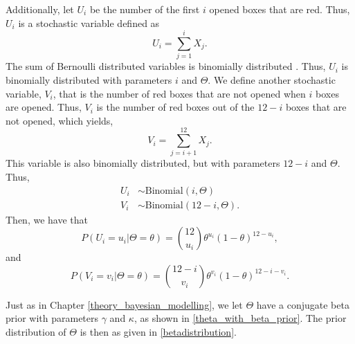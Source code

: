 Additionally, let $U_i$ be the number of the first $i$ opened boxes that are red. Thus, $U_i$ is a stochastic variable defined as
\begin{equation}
\label{def_of_U}
    U_i = \sum_{j=1}^{i} X_j. 
\end{equation}
The sum of Bernoulli distributed variables is binomially distributed \citep{statinf}. Thus, $U_i$ is binomially distributed with parameters $i$ and $\Theta$. We define another stochastic variable, $V_i$, that is the number of red boxes that are not opened when $i$ boxes are opened. Thus, $V_i$ is the number of red boxes out of the $12-i$ boxes that are not opened, which yields,
\begin{equation}
\label{def_of_V}
    V_i = \sum_{j=i+1}^{12} X_j.
\end{equation}
This variable is also binomially distributed, but with parameters $12-i$ and $\Theta$. Thus,
\begin{equation}
\label{U_V_binomal_distri}
    \begin{aligned}
        U_i &\sim \text{Binomial}(i,\Theta)\\
        V_i &\sim \text{Binomial}(12-i,\Theta).
    \end{aligned}
\end{equation}
Then, we have that 
\begin{equation}
\label{ui_prob_mass}
    P(U_i=u_i|\Theta=\theta) = \binom{12}{u_i} \theta^{u_i}(1-\theta)^{12-u_i},
\end{equation}
and
\begin{equation}
\label{vi_prob_mass}
    P(V_i=v_i|\Theta=\theta) = \binom{12-i}{v_i} \theta^{v_i}(1-\theta)^{12-i-v_i}.
\end{equation}

Just as in Chapter \ref{theory_bayesian_modelling}, we let $\Theta$ have a conjugate beta prior with parameters $\gamma$ and $\kappa$, as shown in \eqref{theta_with_beta_prior}.
The prior distribution of $\Theta$ is then as given in \eqref{betadistribution}.


